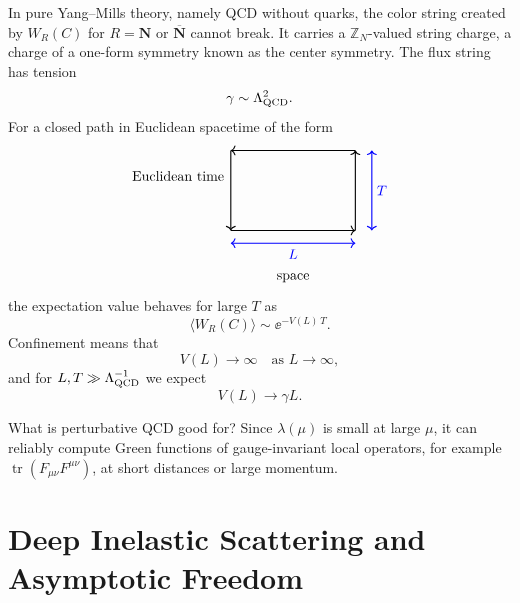 In pure Yang--Mills theory, namely QCD without quarks, the color string
created by \(W_R(C)\) for \(R=\mathbf N\) or \(\overline{\mathbf N}\) cannot
break.  It carries a \(\mathbb Z_N\)-valued string charge, a charge of a
one-form symmetry known as the center symmetry.  The flux string has
tension
\[
  \gamma\sim\Lambda_{\rm QCD}^2.
\]
For a closed path in Euclidean spacetime of the form
\[
\begin{tikzpicture}[scale=0.92,baseline={(0,-0.2)}]
  \draw[thick,->] (-1.7,-1.1) -- (1.7,-1.1);
  \draw[thick,->] (1.7,-1.1) -- (1.7,1.1);
  \draw[thick,->] (1.7,1.1) -- (-1.7,1.1);
  \draw[thick,->] (-1.7,1.1) -- (-1.7,-1.1);
  \draw[blue,<->,thick] (-1.7,-1.45) -- (1.7,-1.45);
  \node[blue] at (0,-1.75) {\(L\)};
  \draw[blue,<->,thick] (2.15,-1.1) -- (2.15,1.1);
  \node[blue,right] at (2.15,0) {\(T\)};
  \node[left] at (-1.75,0.4) {Euclidean time};
  \node[below] at (0,-2.15) {space};
\end{tikzpicture}
\]
the expectation value behaves for large \(T\) as
\[
  \langle W_R(C)\rangle \sim \ee^{-V(L)\,T}.
\]
Confinement means that
\[
  V(L)\to\infty\quad\text{as }L\to\infty,
\]
and for \(L,T\gg\Lambda_{\rm QCD}^{-1}\) we expect
\[
  V(L)\to \gamma L .
\]

What is perturbative QCD good for?  Since \(\lambda(\mu)\) is small at
large \(\mu\), it can reliably compute Green functions of
gauge-invariant local operators, for example
\(\operatorname{tr}(F_{\mu\nu}F^{\mu\nu})\), at short distances or large
momentum.


\section{Deep Inelastic Scattering and Asymptotic Freedom}

